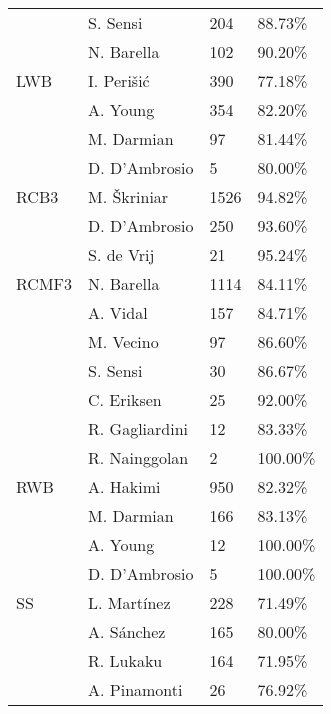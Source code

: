 \begin{table}[!htbp]
\begin{tabular}{@{}llll@{}}
            & S. Sensi       & 204         & 88.73\%  \\
            & N. Barella     & 102         & 90.20\%  \\
LWB              & I. Perišić     & 390         & 77.18\%  \\
              & A. Young       & 354         & 82.20\%  \\
             & M. Darmian     & 97          & 81.44\%  \\
              & D. D'Ambrosio  & 5           & 80.00\%  \\
RCB3             & M. Škriniar    & 1526        & 94.82\%  \\
             & D. D'Ambrosio  & 250         & 93.60\%  \\
             & S. de Vrij     & 21          & 95.24\%  \\
RCMF3            & N. Barella     & 1114        & 84.11\%  \\
            & A. Vidal       & 157         & 84.71\%  \\
            & M. Vecino      & 97          & 86.60\%  \\
            & S. Sensi       & 30          & 86.67\%  \\
            & C. Eriksen     & 25          & 92.00\%  \\
            & R. Gagliardini & 12          & 83.33\%  \\
           & R. Nainggolan  & 2           & 100.00\% \\
RWB              & A. Hakimi      & 950         & 82.32\%  \\
             & M. Darmian     & 166         & 83.13\%  \\
              & A. Young       & 12          & 100.00\% \\
              & D. D'Ambrosio  & 5           & 100.00\% \\
SS               & L. Martínez    & 228         & 71.49\%  \\
              & A. Sánchez     & 165         & 80.00\%  \\
              & R. Lukaku      & 164         & 71.95\%  \\
              & A. Pinamonti   & 26          & 76.92\%  \\ \bottomrule
\end{tabular}

\label{tab:inter_position_comp}
\end{table}
